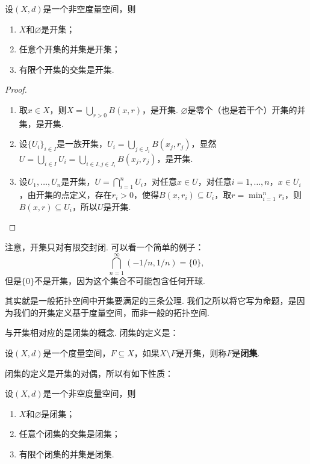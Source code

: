 \begin{proposition}\label{proposition:open-prop}
    设$(X,d)$是一个非空度量空间，则
    \begin{enumerate}
        \item $X$和$\varnothing$是开集；
        \item 任意个开集的并集是开集；
        \item 有限个开集的交集是开集. 
    \end{enumerate}
\end{proposition}
\begin{proof}
\begin{enumerate}
    \item 取$x\in X$，则$X=\bigcup_{r>0}B(x,r)$，是开集. $\varnothing$是零个（也是若干个）开集的并集，是开集. 

    \item 设$\{U_i\}_{i\in I}$是一族开集，$U_i=\bigcup_{j\in J_i} B(x_j,r_j)$，显然$U=\bigcup_{i\in I}U_i=\bigcup_{i\in I,j\in J_i} B(x_j,r_j)$，是开集. 

    \item 设$U_1,\dots,U_n$是开集，$U=\bigcap_{i=1}^nU_i$，对任意$x\in U$，对任意$i=1,\dots,n$，$x\in U_i$，由开集的点定义，存在$r_i>0$，使得$B(x,r_i)\subseteq U_i$，取$r=\min_{i=1}^n r_i$，则$B(x,r)\subseteq U_i$，所以$U$是开集. 
\end{enumerate}
\end{proof}

注意，开集只对有限交封闭. 可以看一个简单的例子：
\[\bigcap_{n=1}^\infty(-1/n,1/n)=\{0\},\]
但是$\{0\}$不是开集，因为这个集合不可能包含任何开球. 

 其实就是一般拓扑空间中开集要满足的三条公理. 我们之所以将它写为命题，是因为我们的开集定义基于度量空间，而非一般的拓扑空间.

与开集相对应的是闭集的概念. 闭集的定义是：

\begin{definition}[闭集]
    设$(X,d)$是一个度量空间，$F\subseteq X$，如果$X\setminus F$是开集，则称$F$是\textbf{闭集}. 
\end{definition}
闭集的定义是开集的对偶，所以有如下性质：

\begin{proposition}\label{proposition:closed-prop}
    设$(X,d)$是一个非空度量空间，则
    \begin{enumerate}
        \item $X$和$\varnothing$是闭集；
        \item 任意个闭集的交集是闭集；
        \item 有限个闭集的并集是闭集. 
    \end{enumerate}
\end{proposition}

